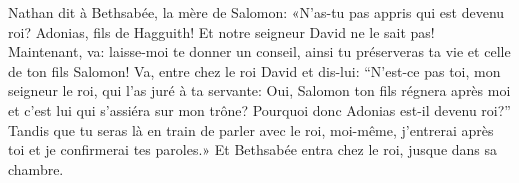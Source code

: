 Nathan dit à Bethsabée, la mère de Salomon:
	«N’as-tu pas appris qui est devenu roi?
	Adonias, fils de Hagguith!
	Et notre seigneur David ne le sait pas!
Maintenant, va: laisse-moi te donner un conseil,
	ainsi tu préserveras ta vie et celle de ton fils Salomon!
Va, entre chez le roi David et dis-lui:
	“N’est-ce pas toi, mon seigneur le roi, qui l’as juré à ta servante:
	Oui, Salomon ton fils régnera après moi
		et c’est lui qui s’assiéra sur mon trône?
	Pourquoi donc Adonias est-il devenu roi?”
Tandis que tu seras là en train de parler avec le roi,
	moi-même, j’entrerai après toi et je confirmerai tes paroles.»
Et Bethsabée entra chez le roi, jusque dans sa chambre.
